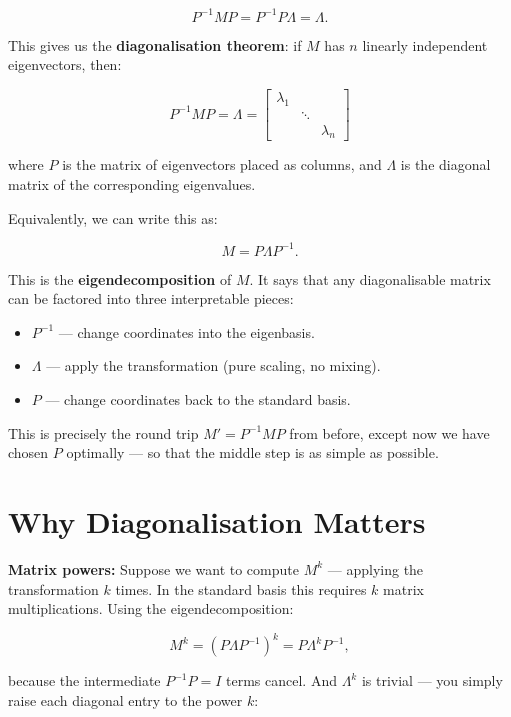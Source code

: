 \documentclass[11pt,openany]{book}
\theoremstyle{definition}
\begin{document}
\[
P^{-1}MP = P^{-1}P\Lambda = \Lambda.
\]

This gives us the \textbf{diagonalisation theorem}: if $M$ has $n$ linearly 
independent eigenvectors, then:

\[
\boxed{P^{-1}MP = \Lambda = 
\begin{bmatrix} \lambda_1 & & \\ & \ddots & \\ & & \lambda_n \end{bmatrix}}
\]

where $P$ is the matrix of eigenvectors placed as columns, and $\Lambda$ is the 
diagonal matrix of the corresponding eigenvalues.

\medskip

Equivalently, we can write this as:

\[
M = P \Lambda P^{-1}.
\]

This is the \textbf{eigendecomposition} of $M$. It says that any diagonalisable 
matrix can be factored into three interpretable pieces:

\begin{itemize}
  \item $P^{-1}$ --- change coordinates into the eigenbasis.
  \item $\Lambda$ --- apply the transformation (pure scaling, no mixing).
  \item $P$ --- change coordinates back to the standard basis.
\end{itemize}

This is precisely the round trip $M' = P^{-1}MP$ from before, except now we have 
chosen $P$ optimally --- so that the middle step is as simple as possible.

\section{Why Diagonalisation Matters}

\textbf{Matrix powers:} Suppose we want to compute $M^k$ --- applying the 
transformation $k$ times. In the standard basis this requires $k$ matrix 
multiplications. Using the eigendecomposition:

\[
M^k = (P\Lambda P^{-1})^k = P \Lambda^k P^{-1},
\]

because the intermediate $P^{-1}P = I$ terms cancel. And $\Lambda^k$ is trivial 
--- you simply raise each diagonal entry to the power $k$:
\end{document}
